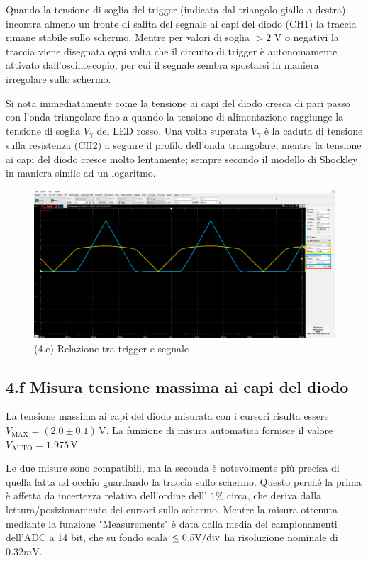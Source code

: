 \documentclass[10pt,a4paper]{article}
\begin{document}
Quando la tensione di soglia del trigger (indicata dal triangolo giallo a
destra) incontra almeno un fronte di salita del segnale ai capi del diodo 
(CH1) la traccia rimane stabile sullo schermo. Mentre per valori di soglia
$> 2$ V o negativi la traccia viene disegnata ogni volta che il circuito di
trigger è autonomamente attivato dall'oscilloscopio, per cui il segnale sembra
spostarsi in maniera irregolare sullo schermo.

Si nota immediatamente come la tensione ai capi del diodo cresca di pari
passo con l'onda triangolare fino a quando la tensione di alimentazione 
raggiunge la tensione di soglia $V_\gamma$ del LED rosso. Una volta superata
$V_\gamma$ è la caduta di tensione sulla resistenza (CH2) a seguire il profilo
dell'onda triangolare, mentre la tensione ai capi del diodo cresce molto
lentamente; sempre secondo il modello di Shockley in maniera simile ad un
logaritmo.

\begin{figure}[htb]
\centering
\includegraphics[scale=0.3]{trgdiode_new}
\caption{(4.e) Relazione tra trigger e segnale}
\end{figure}


\subsection*{4.f Misura tensione massima ai capi del diodo}

La tensione massima ai capi del diodo misurata con i cursori risulta essere
$V_{\mathrm{MAX}}= (2.0 \pm 0.1) \,\mathrm{V}$. La funzione di misura
automatica fornisce il valore $V_{\mathrm{AUTO}}= 1.975 \,\mathrm{V}$

Le due misure sono compatibili, ma la seconda è notevolmente più precisa di
quella fatta ad occhio guardando la traccia sullo schermo. Questo perché la
prima è affetta da incertezza relativa dell'ordine dell' $1\%$ circa, che
deriva dalla lettura/posizionamento dei cursori sullo schermo. Mentre la
misura ottenuta mediante la funzione "Measurements" è data dalla media dei
campionamenti dell'ADC a 14 bit, che su fondo scala $\leq 0.5 \si{\V}/\rm div$
ha risoluzione nominale di $0.32 \si{m\V}$.
\end{document}
